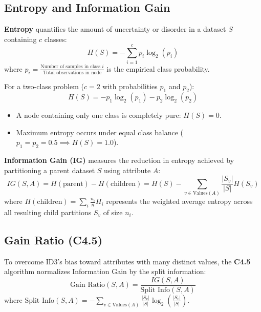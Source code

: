 \subsection{Entropy and Information Gain}
\textbf{Entropy} quantifies the amount of uncertainty or disorder in a dataset $S$ containing $c$ classes:
\begin{equation}
H(S) = -\sum_{i=1}^{c} p_i \log_2(p_i)
\end{equation}
where $p_i = \frac{\text{Number of samples in class } i}{\text{Total observations in node}}$ is the empirical class probability.

For a two-class problem ($c=2$ with probabilities $p_1$ and $p_2$):
\begin{equation}
H(S) = -p_1 \log_2(p_1) - p_2 \log_2(p_2)
\end{equation}
\begin{itemize}
    \item A node containing only one class is completely pure: $H(S) = 0$.
    \item Maximum entropy occurs under equal class balance ($p_1 = p_2 = 0.5 \implies H(S) = 1.0$).
\end{itemize}

\textbf{Information Gain (IG)} measures the reduction in entropy achieved by partitioning a parent dataset $S$ using attribute $A$:
\begin{equation}
IG(S, A) = H(\text{parent}) - H(\text{children}) = H(S) - \sum_{v \in \text{Values}(A)} \frac{|S_v|}{|S|} H(S_v)
\end{equation}
where $H(\text{children}) = \sum_i \frac{n_i}{n} H_i$ represents the weighted average entropy across all resulting child partitions $S_v$ of size $n_i$.

\subsection{Gain Ratio (C4.5)}
To overcome ID3's bias toward attributes with many distinct values, the \textbf{C4.5} algorithm normalizes Information Gain by the split information:
\begin{equation}
\text{Gain Ratio}(S, A) = \frac{IG(S, A)}{\text{Split Info}(S, A)}
\end{equation}
where $\text{Split Info}(S, A) = -\sum_{v \in \text{Values}(A)} \frac{|S_v|}{|S|} \log_2\left(\frac{|S_v|}{|S|}\right)$.

